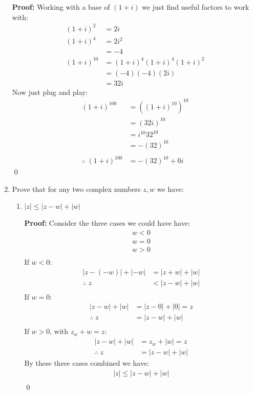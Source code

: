 \begin{enumerate}
	\textbf{Proof:}
	Working with a base of $(1 + i)$ we just find useful factors to work with:
	\begin{align*}
		(1 + i)^2 &= 2i \\
		(1 + i)^4 &= 2i^2 \\
		&= -4 \\
		(1 + i)^{10} &= (1 + i)^4(1 + i)^4(1 + i)^2 \\
		&= (-4)(-4)(2i) \\
		&= 32i
	\end{align*}
	Now just plug and play:
	\begin{align*}
		(1 + i)^{100} &= ((1 + i)^{10})^{10} \\
		&= (32i)^{10} \\
		&= i^{10}32^{10} \\
		&= -(32)^{10} \\
		\\
		\therefore \; (1 + i)^{100} &= -(32)^{10} +0i
	\end{align*}
	\qed


	\item Prove that for any two complex numbers $z, w$ we have:
	\begin{enumerate}
		\item $|z| \leq |z - w| + |w|$
		
		\textbf{Proof:}
		Consider the three cases we could have have:
		\begin{align*}
			w < 0 \\
			w = 0 \\
			w > 0 \\
		\end{align*}
		If $w < 0$:
		\begin{align*}
			|z - (-w)| + |-w| &= |z + w| + |w| \\
			\therefore \; z &< |z - w| + |w| \\
		\end{align*}
		If $w = 0$:
		\begin{align*}
			|z - w| + |w| &= |z - 0| + |0| = z \\
			\therefore \; z &= |z -w| + |w| \\
		\end{align*} 
		If $w > 0$, with $z_w + w = z$:
		\begin{align*}
			|z - w| + |w| &= z_w + |w| = z \\
			\therefore \; z &= |z - w | + |w|
		\end{align*}
		By these three cases combined we have:
		\begin{align*}
			|z| \leq |z - w| + |w| \\
		\end{align*}
		\qed



\end{enumerate}
\end{enumerate}
